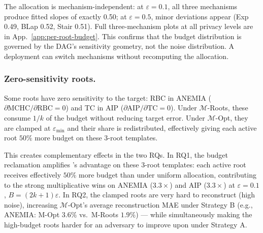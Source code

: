 
The allocation is mechanism-independent: at $\varepsilon = 0.1$, all three mechanisms produce fitted slopes of exactly 0.50; at $\varepsilon = 0.5$, minor deviations appear (Exp 0.49, BLap 0.52, Stair 0.51). Full three-mechanism plots at all privacy levels are in App.~\ref{app:per-root-budget}. This confirms that the budget distribution is governed by the DAG's sensitivity geometry, not the noise distribution. A deployment can switch mechanisms without recomputing the allocation.


\subsubsection{Zero-sensitivity roots.}

Some roots have zero sensitivity to the target: RBC in ANEMIA ($\partial \text{MCHC}/\partial \text{RBC} = 0$) and TC in AIP ($\partial \text{AIP}/\partial \text{TC} = 0$). Under $\mathcal{M}$-Roots, these consume $1/k$ of the budget without reducing target error. Under $\mathcal{M}$-Opt, they are clamped at $\varepsilon_{\min}$ and their share is redistributed, effectively giving each active root $50\%$ more budget on these 3-root templates.

This creates complementary effects in the two RQs. In RQ1, the budget reclamation amplifies \sysname{}'s advantage on these 3-root templates: each active root receives effectively $50\%$ more budget than under uniform allocation, contributing to the strong multiplicative wins on ANEMIA ($3.3\times$) and AIP ($3.3\times$) at $\varepsilon = 0.1$, $B = (2k{+}1)\varepsilon$. In RQ2, the clamped roots are very hard to reconstruct (high noise), increasing $\mathcal{M}$-Opt's average reconstruction MAE under Strategy B (e.g., ANEMIA: M-Opt $3.6\%$ vs.\ M-Roots $1.9\%$) --- while simultaneously making the high-budget roots harder for an adversary to improve upon under Strategy A.

